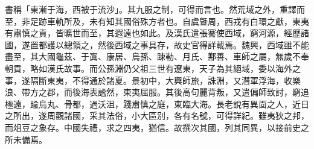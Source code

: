 
\begin{pinyinscope}
書稱「東漸于海，西被于流沙」。其九服之制，可得而言也。然荒域之外，重譯而至，非足跡車軌所及，未有知其國俗殊方者也。自虞曁周，西戎有白環之獻，東夷有肅慎之貢，皆曠世而至，其遐遠也如此。及漢氏遣張騫使西域，窮河源，經歷諸國，遂置都護以總領之，然後西域之事具存，故史官得詳載焉。魏興，西域雖不能盡至，其大國龜茲、于寘、康居、烏孫、踈勒、月氏、鄯善、車師之屬，無歲不奉朝貢，略如漢氏故事。而公孫淵仍父祖三世有遼東，天子為其絕域，委以海外之事，遂隔斷東夷，不得通於諸夏。景初中，大興師旅，誅淵，又潛軍浮海，收樂浪、帶方之郡，而後海表謐然，東夷屈服。其後高句麗背叛，又遣偏師致討，窮追極遠，踰烏丸、骨都，過沃沮，踐肅慎之庭，東臨大海。長老說有異靣之人，近日之所出，遂周觀諸國，采其法俗，小大區別，各有名號，可得詳紀。雖夷狄之邦，而俎豆之象存。中國失禮，求之四夷，猶信。故撰次其國，列其同異，以接前史之所未備焉。


\end{pinyinscope}